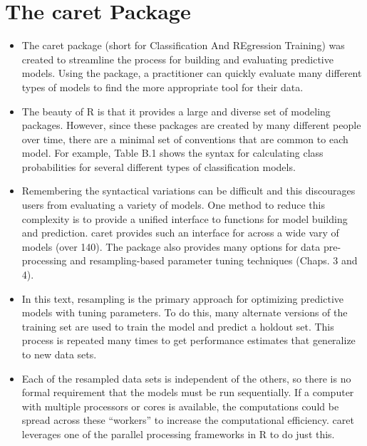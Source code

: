 \section{The caret Package}
\begin{itemize}
\item The caret package (short for Classification And REgression Training) was
created to streamline the process for building and evaluating predictive models.
Using the package, a practitioner can quickly evaluate many different
types of models to find the more appropriate tool for their data.

\item The beauty of R is that it provides a large and diverse set of modeling packages.
However, since these packages are created by many different people over
time, there are a minimal set of conventions that are common to each model.
For example, Table B.1 shows the syntax for calculating class probabilities for
several different types of classification models. 

\item Remembering the syntactical
variations can be difficult and this discourages users from evaluating a variety
of models. One method to reduce this complexity is to provide a unified interface
to functions for model building and prediction. caret provides such an
interface for across a wide vary of models (over 140). The package also provides
many options for data pre-processing and resampling-based parameter
tuning techniques (Chaps. 3 and 4).

\item In this text, resampling is the primary approach for optimizing predictive
models with tuning parameters. To do this, many alternate versions of the
training set are used to train the model and predict a holdout set. This process
is repeated many times to get performance estimates that generalize to
new data sets. 

\item 
Each of the resampled data sets is independent of the others,
so there is no formal requirement that the models must be run sequentially.
If a computer with multiple processors or cores is available, the computations
could be spread across these “workers” to increase the computational
efficiency. caret leverages one of the parallel processing frameworks in R to do
just this. 


\end{itemize}

